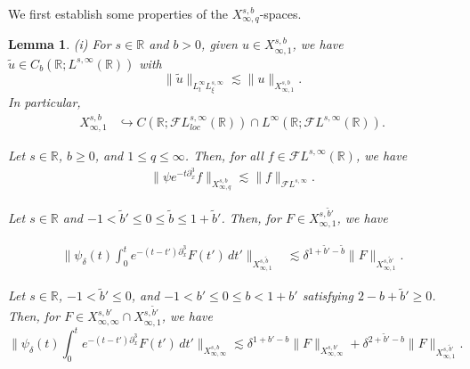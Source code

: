 \documentclass[a4paper, 11pt]{amsart}
\newcommand{\R}{\mathbb{R}}
\theoremstyle{plain}
\newtheorem{lem}[thm]{Lemma}
\theoremstyle{definition}
\theoremstyle{remark}
\newcommand{\5}{\text{V}}
\newcommand{\noi}{\noindent}
\newcommand{\FL}{\mathcal{F} L}
\newcommand{\les}{\lesssim}
\newcommand{\dl}{\delta}
\newcommand{\wt}{\widetilde}
\newcommand{\embeds}{\hookrightarrow}
\newcommand{\dx}{\partial_x}
\numberwithin{equation}{section}
\theoremstyle{mytheoremstyle} \newtheorem{nota}[thm]{Remark}
\theoremstyle{mytheoremstyle} \newtheorem{exemplo}[thm]{Example}
\begin{document}
We first establish some properties of the $X^{s,b}_{\infty,q}$-spaces.
\begin{lem}


{\rm(i)} For $s\in\R$ and $b>0$,  given $u\in X^{s,b}_{\infty,1}$, we have $\tilde{u}\in C_b(\R;L^{s,\infty}(\R))$ with
\begin{equation}\label{lin}
    \|\tilde{u}\|_{L^\infty_tL^{s,\infty}_\xi}\lesssim \|u\|_{X^{s,b}_{\infty,1}}. 
\end{equation}
In particular,
\noi
\begin{align}
X^{s,b}_{\infty, 1} &\embeds C(\R; \FL_{loc}^{s,\infty}(\R))\cap L^\infty(\R; \mathcal{F}L^{s,\infty}(\R)).
\end{align}


\smallskip


\noi {\rm(ii)} Let $s\in\R$, $b\ge0$, and $1\le q \le \infty$. Then, for all $f \in \FL^{s,\infty}(\R)$, we have
\begin{align}
\label{lin1}
\| \psi e^{-t\dx^3} f \|_{X^{s,b}_{\infty,q}} \les \| f \|_{\FL^{s,\infty}}.
\end{align}



\noi{\rm(iii)} Let $s\in\R$ and $-1<\tilde{b}' \le 0 \le \tilde{b} \le 1+\tilde{b}'$. Then, for $F\in X^{s,\tilde{b}'}_{\infty,1}$, we have

\noi
\begin{align}
\label{lin2a}
\bigg\| \psi_\dl (t) \int_0^t e^{-(t-t')\dx^3 } F(t') \, dt' \bigg\|_{X^{s,\tilde{b}}_{\infty,1} } & \les \dl^{1+\tilde{b}'-\tilde{b}} \| F \|_{X^{s,\tilde{b}'}_{\infty,1}}.
\end{align}



\noi{\rm(iv)} Let $s\in\R$, $-1 < \wt{b}'\le 0$, and $-1<b' \le 0 \le b < 1+b'$ satisfying $2-b+\tilde{b}'\ge 0$. Then, for $F\in X^{s,b'}_{\infty, \infty} \cap X^{s, \wt{b}'}_{\infty, 1}$, we have
\begin{equation}
\label{lin2b}
\bigg\| \psi_\dl (t) \int_0^t e^{-(t-t')\dx^3} F(t') \, dt' \bigg\|_{X^{s,b}_{\infty, \infty} } \les \dl^{1+b'-b} \| F\|_{X^{s, b'}_{\infty, \infty}} + \dl^{2+\wt{b}' -b} \|F\|_{X^{s, \wt{b}'}_{\infty, 1}}.
\end{equation}



\end{lem}
\end{document}
